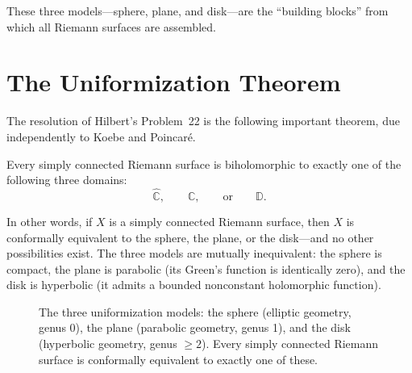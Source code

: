 These three models---sphere, plane, and disk---are the ``building blocks'' from which all Riemann surfaces are assembled.

\section{The Uniformization Theorem}

The resolution of Hilbert's Problem~22 is the following important theorem, due independently to Koebe and Poincar\'e.

\begin{theorem}
\label{thm:uniformization}
Every simply connected Riemann surface is biholomorphic to exactly one of the following three domains:
\[
    \widehat{\mathbb{C}}, \qquad \mathbb{C}, \qquad \text{or} \qquad \mathbb{D}.
\]
\end{theorem}

In other words, if $X$ is a simply connected Riemann surface, then $X$ is conformally equivalent to the sphere, the plane, or the disk---and no other possibilities exist. The three models are mutually inequivalent: the sphere is compact, the plane is parabolic (its Green's function is identically zero), and the disk is hyperbolic (it admits a bounded nonconstant holomorphic function).

\begin{figure}[htbp]
\centering
{}
\caption{The three uniformization models: the sphere (elliptic geometry, genus 0), the plane (parabolic geometry, genus 1), and the disk (hyperbolic geometry, genus $\geq 2$). Every simply connected Riemann surface is conformally equivalent to exactly one of these.}
\label{fig:uniformization-models}
\end{figure}

